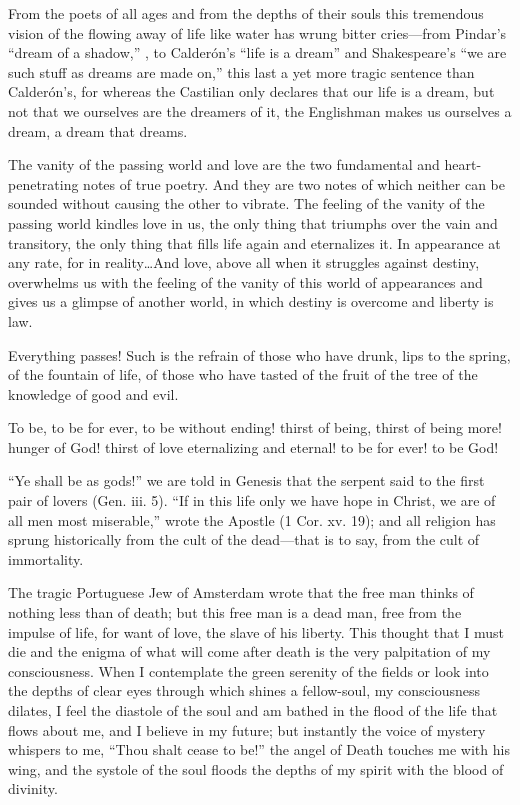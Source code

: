 From the poets of all ages and from the depths of their souls this
tremendous vision of the flowing away of life like water has wrung
bitter cries---from Pindar's ``dream of a shadow,'' ,
to Calder\'on's ``life is a dream'' and Shakespeare's ``we are such
stuff as dreams are made on,'' this last a yet more tragic sentence
than Calder\'on's, for whereas the Castilian only declares that our
life is a dream, but not that we ourselves are the dreamers of it, the
Englishman makes us ourselves a dream, a dream that dreams.

The vanity of the passing world and love are the two fundamental and
heart-penetrating notes of true poetry. And they are two notes of
which neither can be sounded without causing the other to vibrate. The
feeling of the vanity of the passing world kindles love in us, the
only thing that triumphs over the vain and transitory, the only thing
that fills life again and eternalizes it. In appearance at any rate,
for in reality\ldots And love, above all when it struggles against
destiny, overwhelms us with the feeling of the vanity of this world of
appearances and gives us a glimpse of another world, in which destiny
is overcome and liberty is law.

Everything passes! Such is the refrain of those who have
drunk, lips to the spring, of the fountain of life, of those who have
tasted of the fruit of the tree of the knowledge of good and evil.

To be, to be for ever, to be without ending! thirst of being, thirst
of being more! hunger of God! thirst of love eternalizing and eternal!
to be for ever! to be God!

``Ye shall be as gods!'' we are told in Genesis that the serpent said
to the first pair of lovers (Gen. iii. 5). ``If in this life only we
have hope in Christ, we are of all men most miserable,'' wrote the
Apostle (1 Cor. xv. 19); and all religion has sprung historically from
the cult of the dead---that is to say, from the cult of immortality.

The tragic Portuguese Jew of Amsterdam wrote that the free man thinks
of nothing less than of death; but this free man is a dead man, free
from the impulse of life, for want of love, the slave of his liberty.
This thought that I must die and the enigma of what will come after
death is the very palpitation of my consciousness. When I contemplate
the green serenity of the fields or look into the depths of clear eyes
through which shines a fellow-soul, my consciousness dilates, I feel
the diastole of the soul and am bathed in the flood of the life that
flows about me, and I believe in my future; but instantly the voice of
mystery whispers to me, ``Thou shalt cease to be!'' the angel of Death
touches me with his wing, and the systole of the soul floods the
depths of my spirit with the blood of divinity.

